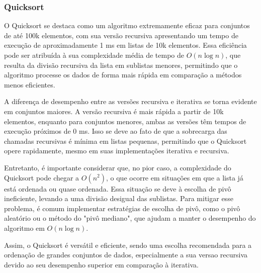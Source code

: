 \subsubsection{Quicksort}

\hspace{0.6cm}O Quicksort se destaca como um algoritmo extremamente eficaz para conjuntos de até 100k elementos, com sua versão recursiva apresentando um tempo de execução de aproximadamente 1 ms em listas de 10k elementos. Essa eficiência pode ser atribuída à sua complexidade média de tempo de \(O(n \log n)\), que resulta da divisão recursiva da lista em sublistas menores, permitindo que o algoritmo processe os dados de forma mais rápida em comparação a métodos menos eficientes.

A diferença de desempenho entre as versões recursiva e iterativa se torna evidente em conjuntos maiores. A versão recursiva é mais rápida a partir de 10k elementos, enquanto para conjuntos menores, ambas as versões têm tempos de execução próximos de 0 ms. Isso se deve ao fato de que a sobrecarga das chamadas recursivas é mínima em listas pequenas, permitindo que o Quicksort opere rapidamente, mesmo em suas implementações iterativa e recursiva.

Entretanto, é importante considerar que, no pior caso, a complexidade do Quicksort pode chegar a \(O(n^2)\), o que ocorre em situações em que a lista já está ordenada ou quase ordenada. Essa situação se deve à escolha de pivô ineficiente, levando a uma divisão desigual das sublistas. Para mitigar esse problema, é comum implementar estratégias de escolha de pivô, como o pivô aleatório ou o método do "pivô mediano", que ajudam a manter o desempenho do algoritmo em \(O(n \log n)\).

Assim, o Quicksort é versátil e eficiente, sendo uma escolha recomendada para a ordenação de grandes conjuntos de dados, especialmente a sua versao recursiva devido ao seu desempenho superior em comparação à iterativa.
